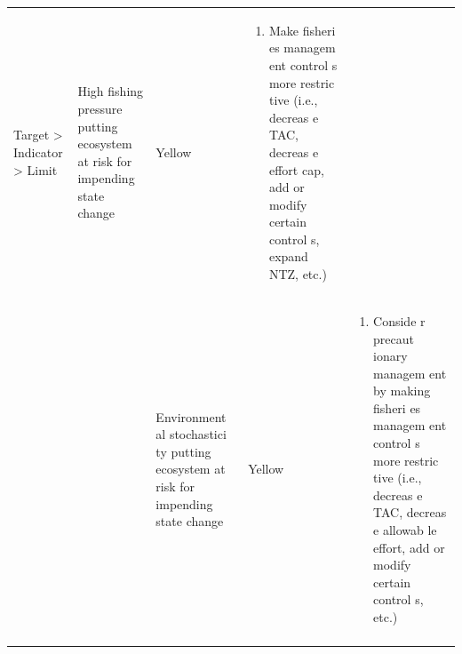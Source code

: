 \documentclass[]{book}
\providecommand{\tightlist}{%
  \setlength{\itemsep}{0pt}\setlength{\parskip}{0pt}}
\begin{document}
\begin{longtable}[]{@{}lllll@{}}
\begin{minipage}[t]{0.19\columnwidth}
Target \textgreater{} Indicator \textgreater{} Limit\strut
\end{minipage} & \begin{minipage}[t]{0.19\columnwidth}\raggedright\strut
High fishing pressure putting ecosystem at risk for impending state
change\strut
\end{minipage} & \begin{minipage}[t]{0.19\columnwidth}\raggedright\strut
Yellow\strut
\end{minipage} & \begin{minipage}[t]{0.19\columnwidth}\raggedright\strut
\begin{enumerate}
\def\labelenumi{\arabic{enumi}.}
\tightlist
\item
  Make fisheri es managem ent control s more restric tive (i.e., decreas
  e TAC, decreas e effort cap, add or modify certain control s, expand
  NTZ, etc.)
\end{enumerate}\strut
\end{minipage}\tabularnewline
\begin{minipage}[t]{0.19\columnwidth}\raggedright\strut
\strut
\end{minipage} & \begin{minipage}[t]{0.19\columnwidth}\raggedright\strut
\strut
\end{minipage} & \begin{minipage}[t]{0.19\columnwidth}\raggedright\strut
Environment al stochastici ty putting ecosystem at risk for impending
state change\strut
\end{minipage} & \begin{minipage}[t]{0.19\columnwidth}\raggedright\strut
Yellow\strut
\end{minipage} & \begin{minipage}[t]{0.19\columnwidth}\raggedright\strut
\begin{enumerate}
\def\labelenumi{\arabic{enumi}.}
\tightlist
\item
  Conside r precaut ionary managem ent by making fisheri es managem ent
  control s more restric tive (i.e., decreas e TAC, decreas e allowab le
  effort, add or modify certain control s, etc.)
\end{enumerate}\strut
\end{minipage}\tabularnewline
\begin{minipage}[t]{0.19\columnwidth}\raggedright\strut
\strut
\end{minipage} & \begin{minipage}[t]{0.19\columnwidth}\raggedright\strut

\end{minipage}
\end{longtable}
\end{document}

